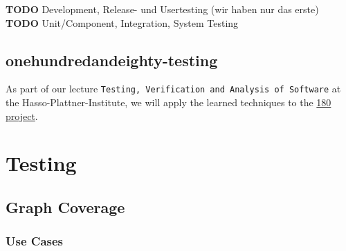 \documentclass[]{article}
\begin{document}
\textbf{TODO} Development, Release- und Usertesting (wir haben nur das
erste) \textbf{TODO} Unit/Component, Integration, System Testing

\subsection{onehundredandeighty-testing}\label{onehundredandeighty-testing}

As part of our lecture
\texttt{Testing, Verification and Analysis of Software} at the
Hasso-Plattner-Institute, we will apply the learned techniques to the
\href{https://github.com/knub/onehundredandeighty}{180 project}.


\section{Testing}

\subsection{Graph Coverage}
\subsubsection{Use Cases}
\end{document}
